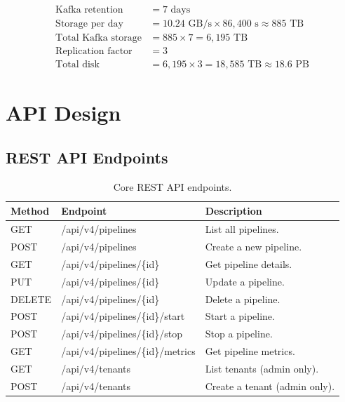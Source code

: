 \documentclass[
    language=english,
    doctype=technical-report,
    institution=none,
    titlestyle=book,
    oneside,
]{../../omnilatex}
\begin{document}
\begin{align}
    \text{Kafka retention} &= 7\text{ days} \\
    \text{Storage per day} &= 10.24\text{ GB/s} \times 86{,}400\text{ s} \approx 885\text{ TB} \\
    \text{Total Kafka storage} &= 885 \times 7 = 6{,}195\text{ TB} \\
    \text{Replication factor} &= 3 \\
    \text{Total disk} &= 6{,}195 \times 3 = 18{,}585\text{ TB} \approx 18.6\text{ PB}
\end{align}

\chapter{API Design}
\label{sec:api}

\section{REST API Endpoints}

\begin{table}[htbp]
    \centering
    \caption{Core REST API endpoints.}
    \label{tab:api}
    \begin{tabular}{@{}lp{4cm}p{5cm}@{}}
        \toprule
        Method & Endpoint & Description \\
        \midrule
        GET & /api/v4/pipelines & List all pipelines. \\
        POST & /api/v4/pipelines & Create a new pipeline. \\
        GET & /api/v4/pipelines/\{id\} & Get pipeline details. \\
        PUT & /api/v4/pipelines/\{id\} & Update a pipeline. \\
        DELETE & /api/v4/pipelines/\{id\} & Delete a pipeline. \\
        POST & /api/v4/pipelines/\{id\}/start & Start a pipeline. \\
        POST & /api/v4/pipelines/\{id\}/stop & Stop a pipeline. \\
        GET & /api/v4/pipelines/\{id\}/metrics & Get pipeline metrics. \\
        GET & /api/v4/tenants & List tenants (admin only). \\
        POST & /api/v4/tenants & Create a tenant (admin only). \\
        \bottomrule
    \end{tabular}
\end{table}
\end{document}
